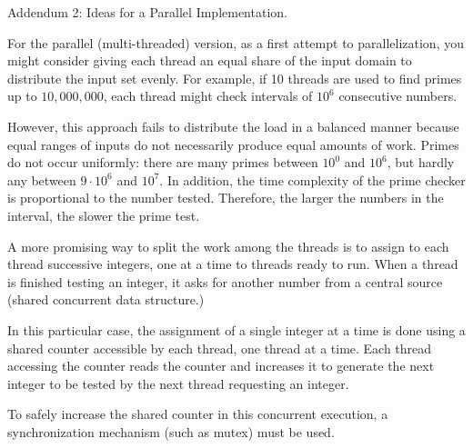 \documentclass[12pt]{article}
\begin{document}
\noindent%
\vspace{10pt}
\begin{center}
  {\Large Addendum 2: Ideas for a Parallel Implementation.}\par
\end{center}
\vspace{10pt}

For the parallel (multi-threaded) version, as a first attempt to parallelization, you might consider giving each thread an equal share of the input domain to distribute the input set evenly. For example, if 10 threads are used to find primes up to $10,000,000$, each thread might check intervals of $10^{6}$ consecutive numbers.

However, this approach fails to distribute the load in a balanced manner because equal ranges of inputs do not necessarily produce equal amounts of work. Primes do not occur uniformly: there are many primes between $10^{0}$ and $10^{6}$, but hardly any between $9\cdot10^6$ and $10^{7}$. In addition, the time complexity of the prime checker is proportional to the number tested. Therefore, the larger the numbers in the interval, the slower the prime test.

\vspace{5pt}

A more promising way to split the work among the threads is to assign to each thread successive integers, one at a time to threads ready to run. When a thread is finished testing an integer, it asks for another number from a central source (shared concurrent data structure.)

In this particular case, the assignment of a single integer at a time is done using a shared counter accessible by each thread, one thread at a time. Each thread accessing the counter reads the counter and increases it to generate the next integer to be tested by the next thread requesting an integer.

To safely increase the shared counter in this concurrent execution, a synchronization mechanism (such as mutex) must be used.
\end{document}
